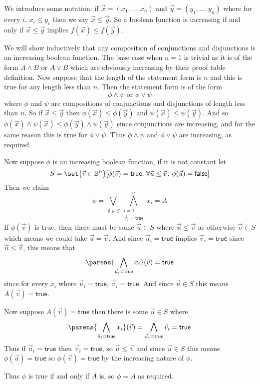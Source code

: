 \documentclass[10pt]{article}
\def\bB{\mathbb{B}}
\def\true{\mathsf{true}}
\def\false{\mathsf{false}}
\begin{document}
\begin{blankpp}

    We introduce some notation: if $\vec x=(x_1,\dots,x_n)$ and $\vec y=(y_1,\dots,y_n)$ where for every $i$, $x_i\leq y_i$ then we say $\vec x\leq\vec y$.
    So a boolean function is increasing if and only if $\vec x\leq\vec y$ implies $f(\vec x)\leq f(\vec y)$.

    We will show inductively that any composition of conjunctions and disjunctions is an increasing boolean function.
    The base case when $n=1$ is trivial as it is of the form $A\land B$ or $A\lor B$ which are obviously increasing by their proof table definition.
    Now suppose that the length of the statement form is $n$ and this is true for any length less than $n$.
    Then the statement form is of the form
    \[ \phi\land\psi \text{ or } \phi\lor\psi \]
    where $\phi$ and $\psi$ are compositions of conjunctions and disjunctions of length less than $n$.
    So if $\vec x\leq\vec y$ then $\phi(\vec x)\leq\phi(\vec y)$ and $\psi(\vec x)\leq\psi(\vec y)$.
    And so $\phi(\vec x)\land\psi(\vec x)\leq\phi(\vec y)\land\psi(\vec y)$ since conjunctions are increasing, and for the same reason this is true for $\phi\lor\psi$.
    Thus $\phi\land\psi$ and $\phi\lor\psi$ are increasing, as required.

    Now suppose $\phi$ is an increasing boolean function, if it is not constant let
    \[ S = \set{\vec v\in\bB^n}[\phi(\vec v)=\true,\,\forall \vec u\leq\vec v\colon \phi(\vec u)=\false] \]
    Then we claim
    \[ \phi = \bigvee_{\vec v\in S}\bigwedge_{\substack{i=1 \\ \vec v_i=\true}}^n x_i = A \]
    If $\phi(\vec v)$ is true, then there must be some $\vec u\in S$ where $\vec u\leq\vec v$ as otherwise $\vec v\in S$ which means we could take $\vec u=\vec v$.
    And since $\vec u_i=\true$ implies $\vec v_i=\true$ since $\vec u\leq\vec v$, this means that
    \[ \parens{\bigwedge_{\vec u_i=\true} x_i}(\vec v) = \true \]
    since for every $x_i$ where $\vec u_i=\true$, $\vec v_i=\true$.
    And since $\vec u\in S$ this means $A(\vec v)=\true$.

    Now suppose $A(\vec v)=\true$ then there is some $\vec u\in S$ where
    \[ \parens{\bigwedge_{\vec u_i=\true} x_i}(\vec v) = \bigwedge_{\vec u_i=\true} \vec v_i = \true \]
    Thus if $\vec u_i=\true$ then $\vec v_i=\true$, so $\vec u\leq\vec v$ and since $\vec u\in S$ this means $\phi(\vec u)=\true$ so $\phi(\vec v)=\true$ by the increasing nature of $\phi$.

    Thus $\phi$ is true if and only if $A$ is, so $\phi=A$ as required.

\end{blankpp}
\end{document}
